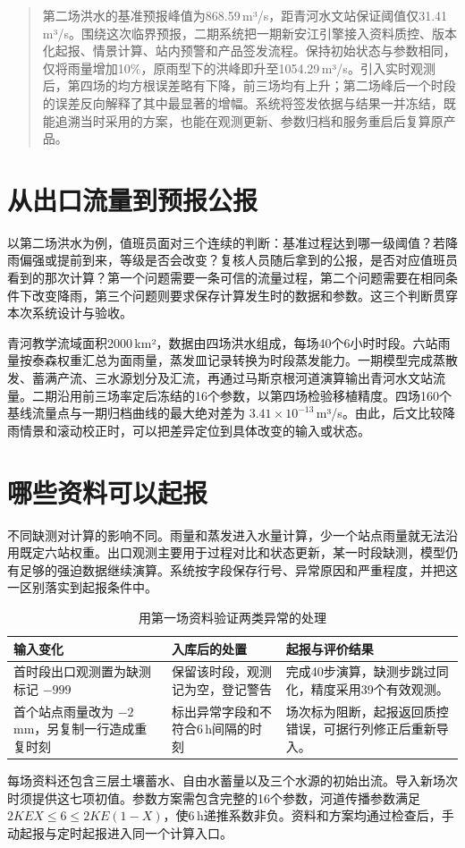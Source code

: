
\usepackage{float}

\begin{abstract}
第二场洪水的基准预报峰值为868.59\,m³/s，距青河水文站保证阈值仅31.41\,m³/s。围绕这次临界预报，二期系统把一期新安江引擎接入资料质控、版本化起报、情景计算、站内预警和产品签发流程。保持初始状态与参数相同，仅将雨量增加10\%，原雨型下的洪峰即升至1054.29\,m³/s。引入实时观测后，第四场的均方根误差略有下降，前三场均有上升；第二场峰后一个时段的误差反向解释了其中最显著的增幅。系统将签发依据与结果一并冻结，既能追溯当时采用的方案，也能在观测更新、参数归档和服务重启后复算原产品。
\end{abstract}

\section{从出口流量到预报公报}
以第二场洪水为例，值班员面对三个连续的判断：基准过程达到哪一级阈值？若降雨偏强或提前到来，等级是否会改变？复核人员随后拿到的公报，是否对应值班员看到的那次计算？第一个问题需要一条可信的流量过程，第二个问题需要在相同条件下改变降雨，第三个问题则要求保存计算发生时的数据和参数。这三个判断贯穿本次系统设计与验收。

青河教学流域面积2000\,km²，数据由四场洪水组成，每场40个6小时时段。六站雨量按泰森权重汇总为面雨量，蒸发皿记录转换为时段蒸发能力。一期模型完成蒸散发、蓄满产流、三水源划分及汇流，再通过马斯京根河道演算输出青河水文站流量。二期沿用前三场率定后冻结的16个参数，以第四场检验移植精度。四场160个基线流量点与一期归档曲线的最大绝对差为 $3.41\times10^{-13}$\,m³/s。由此，后文比较降雨情景和滚动校正时，可以把差异定位到具体改变的输入或状态。

\section{哪些资料可以起报}
不同缺测对计算的影响不同。雨量和蒸发进入水量计算，少一个站点雨量就无法沿用既定六站权重。出口观测主要用于过程对比和状态更新，某一时段缺测，模型仍有足够的强迫数据继续演算。系统按字段保存行号、异常原因和严重程度，并把这一区别落实到起报条件中。
\begin{table}[H]\centering\small\caption{用第一场资料验证两类异常的处理}
\begin{tabularx}{\linewidth}{@{}p{.28\linewidth}LL@{}}\toprule 输入变化 & 入库后的处置 & 起报与评价结果\\\midrule
首时段出口观测置为缺测标记 $-999$ & 保留该时段，观测记为空，登记警告 & 完成40步演算，缺测步跳过同化，精度采用39个有效观测。\\
首个站点雨量改为 $-2$\,mm，另复制一行造成重复时刻 & 标出异常字段和不符合6\,h间隔的时刻 & 场次标为阻断，起报返回质控错误，可据行列修正后重新导入。\\\bottomrule\end{tabularx}\end{table}
每场资料还包含三层土壤蓄水、自由水蓄量以及三个水源的初始出流。导入新场次时须提供这七项初值。参数方案需包含完整的16个参数，河道传播参数满足 $2KE X\le6\le2KE(1-X)$，使6\,h递推系数非负。资料和方案均通过检查后，手动起报与定时起报进入同一个计算入口。

